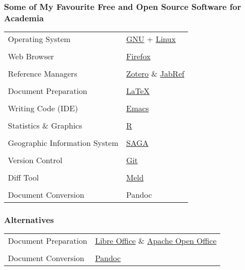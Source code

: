 \documentclass[xcolor=dvipsnames]{beamer}
\begin{document}
\begin{frame}
\frametitle{Some of My Favourite Free and Open Source Software for Academia}
\begin{tabular}{ll}
Operating System       & \href{https://www.gnu.org/}{GNU} + \href{https://kernel.org/}{Linux} \\
                       & \\
Web Browser            & \href{https://www.mozilla.org}{Firefox} \\
                       & \\
Reference Managers     &  \href{https://www.zotero.org/}{Zotero} \& \href{http://jabref.sourceforge.net/}{JabRef} \\
                       & \\
Document Preparation   & \href{https://www.latex-project.org/}{LaTeX} \\
                       & \\
Writing Code (IDE)     & \href{https://www.gnu.org/software/emacs/}{Emacs} \\
                       & \\
Statistics \& Graphics & \href{https://cran.r-project.org/}{R} \\
              & \\
Geographic Information System & \href{http://www.saga-gis.org/en/index.html}{SAGA} \\
           & \\
Version Control & \href{https://git-scm.com/}{Git} \\
           & \\
Diff Tool & \href{http://meldmerge.org/}{Meld} \\
           & \\
Document Conversion & Pandoc \\
\end{tabular}

\end{frame}

\begin{frame}
\frametitle{Alternatives}
\begin{tabular}{ll}
Document Preparation & \href{https://www.libreoffice.org/}{Libre Office} \& \href{https://www.openoffice.org/}{Apache Open Office} \\
& \\
Document Conversion & \href{http://pandoc.org/}{Pandoc} \\
\end{tabular}

\end{frame}
\end{document}

